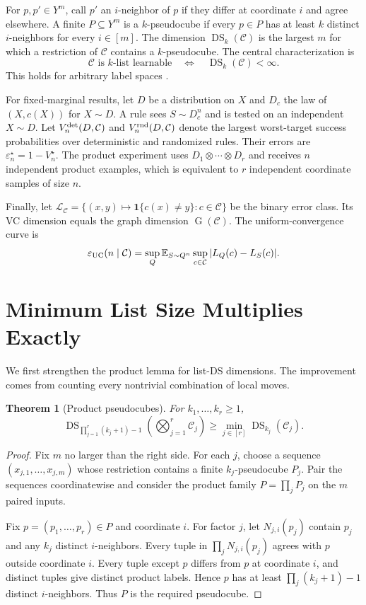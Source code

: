 \documentclass[twoside]{article}
\newtheorem{theorem}{Theorem}
\newcommand{\E}{\mathbb E}
\newcommand{\DS}{\operatorname{DS}}
\newcommand{\G}{\operatorname{G}}
\newcommand{\cC}{\mathcal C}
\newcommand{\cL}{\mathcal L}
\newcommand{\ot}{\mathbin\otimes}
\begin{document}
For $p,p'\in Y^m$, call $p'$ an $i$-neighbor of $p$ if they differ at coordinate $i$ and agree elsewhere. A finite $P\subseteq Y^m$ is a $k$-pseudocube if every $p\in P$ has at least $k$ distinct $i$-neighbors for every $i\in[m]$. The dimension $\DS_k(\cC)$ is the largest $m$ for which a restriction of $\cC$ contains a $k$-pseudocube. The central characterization is
\begin{equation}
\cC\text{ is $k$-list learnable}\quad\Longleftrightarrow\quad \DS_k(\cC)<\infty.
\label{eq:characterization}
\end{equation}
This holds for arbitrary label spaces \citep{charikar2023}.

For fixed-marginal results, let $D$ be a distribution on $X$ and $D_c$ the law of $(X,c(X))$ for $X\sim D$. A rule sees $S\sim D_c^n$ and is tested on an independent $X\sim D$. Let $V_n^{\rm det}(D,\cC)$ and $V_n^{\rm rnd}(D,\cC)$ denote the largest worst-target success probabilities over deterministic and randomized rules. Their errors are $\varepsilon_n^\star=1-V_n^\star$. The product experiment uses $D_1\ot\cdots\ot D_r$ and receives $n$ independent product examples, which is equivalent to $r$ independent coordinate samples of size $n$.

Finally, let $\cL_\cC=\{(x,y)\mapsto\mathbf1\{c(x)\neq y\}:c\in\cC\}$ be the binary error class. Its VC dimension equals the graph dimension $\G(\cC)$. The uniform-convergence curve is \[ \varepsilon_{\rm UC}(n\mid\cC)=\sup_Q\E_{S\sim Q^n}\sup_{c\in\cC}|L_Q(c)-L_S(c)|. \]

\section{Minimum List Size Multiplies Exactly}

We first strengthen the product lemma for list-DS dimensions. The improvement comes from counting every nontrivial combination of local moves.

\begin{theorem}[Product pseudocubes]\label{thm:ds-product}
For $k_1,\ldots,k_r\geq1$, \[ \DS_{\prod_{j=1}^r(k_j+1)-1}\!\left(\bigotimes_{j=1}^r\cC_j\right)\geq\min_{j\in[r]}\DS_{k_j}(\cC_j). \]
\end{theorem}

\begin{proof}
Fix $m$ no larger than the right side. For each $j$, choose a sequence $(x_{j,1},\ldots,x_{j,m})$ whose restriction contains a finite $k_j$-pseudocube $P_j$. Pair the sequences coordinatewise and consider the product family $P=\prod_jP_j$ on the $m$ paired inputs.

Fix $p=(p_1,\ldots,p_r)\in P$ and coordinate $i$. For factor $j$, let $N_{j,i}(p_j)$ contain $p_j$ and any $k_j$ distinct $i$-neighbors. Every tuple in $\prod_jN_{j,i}(p_j)$ agrees with $p$ outside coordinate $i$. Every tuple except $p$ differs from $p$ at coordinate $i$, and distinct tuples give distinct product labels. Hence $p$ has at least $\prod_j(k_j+1)-1$ distinct $i$-neighbors. Thus $P$ is the required pseudocube.
\end{proof}
\end{document}
